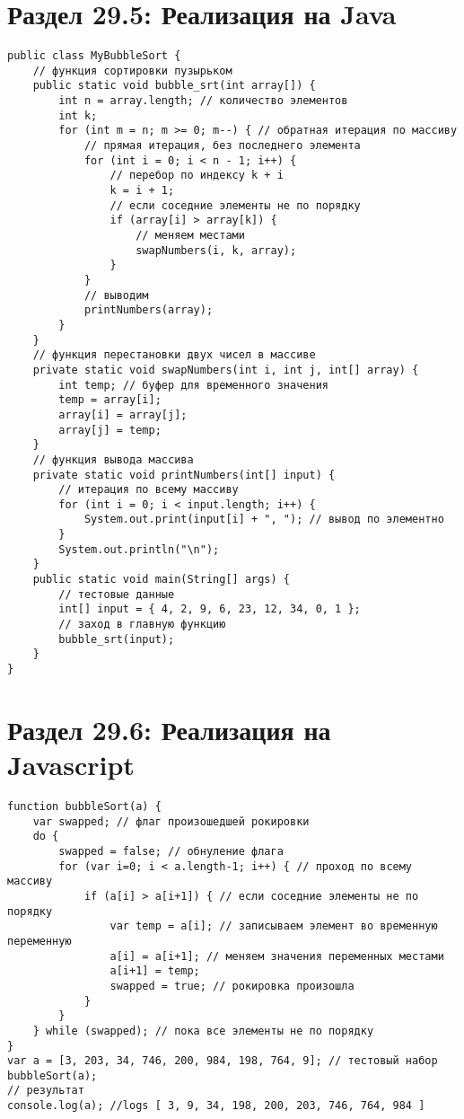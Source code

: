 
\section*{Раздел 29.5: Реализация на Java}
\begin{tcolorbox}
\begin{verbatim}
public class MyBubbleSort {
	// функция сортировки пузырьком
	public static void bubble_srt(int array[]) {
		int n = array.length; // количество элементов
		int k;
		for (int m = n; m >= 0; m--) { // обратная итерация по массиву
			// прямая итерация, без последнего элемента
			for (int i = 0; i < n - 1; i++) {
				// перебор по индексу k + i
				k = i + 1;
				// если соседние элементы не по порядку
				if (array[i] > array[k]) {
					// меняем местами
					swapNumbers(i, k, array);
				}
			}
			// выводим
			printNumbers(array);
		}
	}
	// функция перестановки двух чисел в массиве
	private static void swapNumbers(int i, int j, int[] array) {
		int temp; // буфер для временного значения
		temp = array[i];
		array[i] = array[j];
		array[j] = temp;
	}
	// функция вывода массива
	private static void printNumbers(int[] input) {
		// итерация по всему массиву
		for (int i = 0; i < input.length; i++) {
			System.out.print(input[i] + ", "); // вывод по элементно
		}
		System.out.println("\n");
	}
	public static void main(String[] args) {
		// тестовые данные	
		int[] input = { 4, 2, 9, 6, 23, 12, 34, 0, 1 };
		// заход в главную функцию
		bubble_srt(input);
	}
}
\end{verbatim}
\end{tcolorbox}
\section*{Раздел 29.6: Реализация на Javascript}
\begin{tcolorbox}
\begin{verbatim}
function bubbleSort(a) {
	var swapped; // флаг произошедшей рокировки
	do {
		swapped = false; // обнуление флага
		for (var i=0; i < a.length-1; i++) { // проход по всему массиву
			if (a[i] > a[i+1]) { // если соседние элементы не по порядку
				var temp = a[i]; // записываем элемент во временную переменную
				a[i] = a[i+1]; // меняем значения переменных местами
				a[i+1] = temp;
				swapped = true; // рокировка произошла
			}
		}
	} while (swapped); // пока все элементы не по порядку
}
var a = [3, 203, 34, 746, 200, 984, 198, 764, 9]; // тестовый набор
bubbleSort(a);
// результат
console.log(a); //logs [ 3, 9, 34, 198, 200, 203, 746, 764, 984 ]
\end{verbatim}
\end{tcolorbox}
